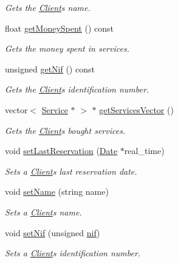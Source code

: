 \begin{DoxyCompactItemize}
\begin{DoxyCompactList}\small\item\em Gets the \hyperlink{class_client}{Client}\textquotesingle{}s name. \end{DoxyCompactList}\item 
float \hyperlink{class_client_a226ff919591e7fdfa6c386e9aa5300a5}{get\+Money\+Spent} () const
\begin{DoxyCompactList}\small\item\em Gets the money spent in services. \end{DoxyCompactList}\item 
unsigned \hyperlink{class_client_a35c9fed8cdb36d28fd5e51bd2aee852e}{get\+Nif} () const
\begin{DoxyCompactList}\small\item\em Gets the \hyperlink{class_client}{Client}\textquotesingle{}s identification number. \end{DoxyCompactList}\item 
vector$<$ \hyperlink{class_service}{Service} $\ast$ $>$ $\ast$ \hyperlink{class_client_a13ab3e2d37fde2de5b6a40d4523bb999}{get\+Services\+Vector} ()
\begin{DoxyCompactList}\small\item\em Gets the \hyperlink{class_client}{Client}\textquotesingle{}s bought services. \end{DoxyCompactList}\item 
void \hyperlink{class_client_a74aaf687afd20e14f0ce93bac63a6fe3}{set\+Last\+Reservation} (\hyperlink{class_date}{Date} $\ast$real\+\_\+time)
\begin{DoxyCompactList}\small\item\em Sets a \hyperlink{class_client}{Client}\textquotesingle{}s last reservation date. \end{DoxyCompactList}\item 
void \hyperlink{class_client_a1c7f938360e23b3e0e52d17965f88725}{set\+Name} (string name)
\begin{DoxyCompactList}\small\item\em Sets a \hyperlink{class_client}{Client}\textquotesingle{}s name. \end{DoxyCompactList}\item 
void \hyperlink{class_client_a8d0ab1a3c654d361dacde7e1d2b92c94}{set\+Nif} (unsigned \hyperlink{class_client_a1c94dc96a56cb5032573fb1d528517c2}{nif})
\begin{DoxyCompactList}\small\item\em Sets a \hyperlink{class_client}{Client}\textquotesingle{}s identification number. \end{DoxyCompactList}\item 

\end{DoxyCompactItemize}
